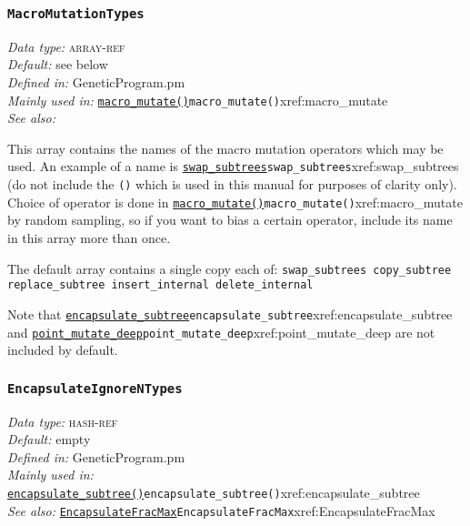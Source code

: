 \documentclass[a4paper]{article}
\begin{document}
\subsubsection{\texttt{MacroMutationTypes}}\label{xref:MacroMutationTypes}
\begin{flushleft}
\textit{Data type:} \textsc{array-ref}\\
\textit{Default:} see below\\
\textit{Defined in:} GeneticProgram.pm\\
\textit{Mainly used in:} \hyperref[no]{\texttt{macro\_mutate()}}{\texttt{macro\_mutate()}}{xref:macro_mutate}\\
\textit{See also:}
\end{flushleft}

This array contains the names of the macro mutation operators which
may be used.  An example of a name is \hyperref[no]{\texttt{swap\_subtrees}}{\texttt{swap\_subtrees}}{xref:swap_subtrees} (do not
include the \texttt{()} which is used in this manual for purposes of
clarity only).  Choice of operator is done in \hyperref[no]{\texttt{macro\_mutate()}}{\texttt{macro\_mutate()}}{xref:macro_mutate} by
random sampling, so if you want to bias a certain operator, include
its name in this array more than once.

The default array contains a single copy each of:
\texttt{swap\_subtrees copy\_subtree replace\_subtree insert\_internal delete\_internal}

Note that \hyperref[no]{\texttt{encapsulate\_subtree}}{\texttt{encapsulate\_subtree}}{xref:encapsulate_subtree} and
\hyperref[no]{\texttt{point\_mutate\_deep}}{\texttt{point\_mutate\_deep}}{xref:point_mutate_deep} are not included by default.

\subsubsection{\texttt{EncapsulateIgnoreNTypes}}\label{xref:EncapsulateIgnoreNTypes}
\begin{flushleft}
\textit{Data type:} \textsc{hash-ref}\\
\textit{Default:} empty\\
\textit{Defined in:} GeneticProgram.pm\\
\textit{Mainly used in:} \hyperref[no]{\texttt{encapsulate\_subtree()}}{\texttt{encapsulate\_subtree()}}{xref:encapsulate_subtree}\\
\textit{See also:} \hyperref[no]{\texttt{EncapsulateFracMax}}{\texttt{EncapsulateFracMax}}{xref:EncapsulateFracMax}
\end{flushleft}
\end{document}
